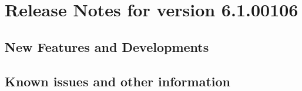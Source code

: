 
\section{Release Notes for version 6.1.00106}

\subsection{New Features and Developments}


\subsection{Known issues and other information}

